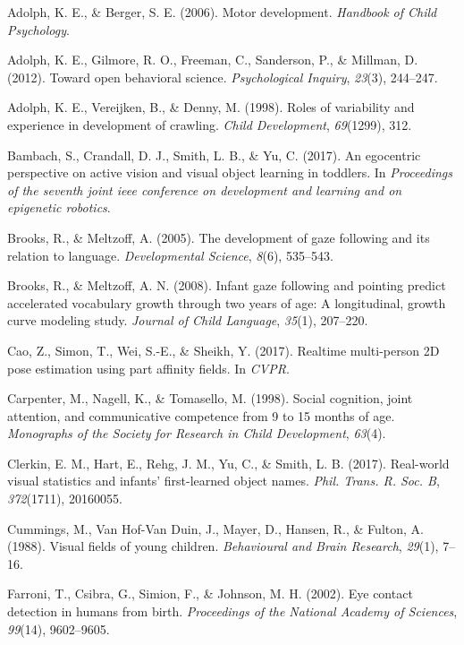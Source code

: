 \documentclass[english,man]{apa6}
\begin{document}
\hypertarget{refs}{}
\hypertarget{ref-adolph2006motor}{}
Adolph, K. E., \& Berger, S. E. (2006). Motor development.
\emph{Handbook of Child Psychology}.

\hypertarget{ref-adolph2012toward}{}
Adolph, K. E., Gilmore, R. O., Freeman, C., Sanderson, P., \& Millman,
D. (2012). Toward open behavioral science. \emph{Psychological Inquiry},
\emph{23}(3), 244--247.

\hypertarget{ref-adolph1998roles}{}
Adolph, K. E., Vereijken, B., \& Denny, M. (1998). Roles of variability
and experience in development of crawling. \emph{Child Development},
\emph{69}(1299), 312.

\hypertarget{ref-bambach2017}{}
Bambach, S., Crandall, D. J., Smith, L. B., \& Yu, C. (2017). An
egocentric perspective on active vision and visual object learning in
toddlers. In \emph{Proceedings of the seventh joint ieee conference on
development and learning and on epigenetic robotics}.

\hypertarget{ref-brooks2005}{}
Brooks, R., \& Meltzoff, A. (2005). The development of gaze following
and its relation to language. \emph{Developmental Science}, \emph{8}(6),
535--543.

\hypertarget{ref-brooks2008}{}
Brooks, R., \& Meltzoff, A. N. (2008). Infant gaze following and
pointing predict accelerated vocabulary growth through two years of age:
A longitudinal, growth curve modeling study. \emph{Journal of Child
Language}, \emph{35}(1), 207--220.

\hypertarget{ref-cao2017realtime}{}
Cao, Z., Simon, T., Wei, S.-E., \& Sheikh, Y. (2017). Realtime
multi-person 2D pose estimation using part affinity fields. In
\emph{CVPR}.

\hypertarget{ref-carpenter1998}{}
Carpenter, M., Nagell, K., \& Tomasello, M. (1998). Social cognition,
joint attention, and communicative competence from 9 to 15 months of
age. \emph{Monographs of the Society for Research in Child Development},
\emph{63}(4).

\hypertarget{ref-clerkin2017}{}
Clerkin, E. M., Hart, E., Rehg, J. M., Yu, C., \& Smith, L. B. (2017).
Real-world visual statistics and infants' first-learned object names.
\emph{Phil. Trans. R. Soc. B}, \emph{372}(1711), 20160055.

\hypertarget{ref-cummings1988}{}
Cummings, M., Van Hof-Van Duin, J., Mayer, D., Hansen, R., \& Fulton, A.
(1988). Visual fields of young children. \emph{Behavioural and Brain
Research}, \emph{29}(1), 7--16.

\hypertarget{ref-farroni2002eye}{}
Farroni, T., Csibra, G., Simion, F., \& Johnson, M. H. (2002). Eye
contact detection in humans from birth. \emph{Proceedings of the
National Academy of Sciences}, \emph{99}(14), 9602--9605.
\end{document}

